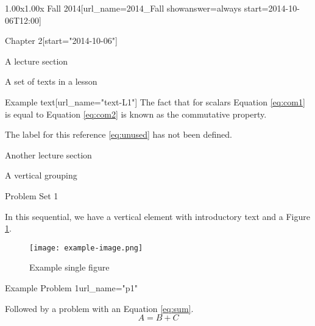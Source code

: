 \documentclass[12pt]{article}
\begin{document}
\begin{edXcourse}{1.00x}{1.00x Fall 2014}[url_name=2014_Fall showanswer=always start=2014-10-06T12:00]
\begin{edXchapter}{Chapter 2}[start="2014-10-06"]
\begin{edXsequential}{A lecture section}
\begin{edXvertical}{A set of texts in a lesson}
\begin{edXtext}{Example text}[url_name="text-L1"]
The fact that for scalars Equation \ref{eq:com1} is equal to Equation \ref{eq:com2} is known as the commutative property.

The label for this reference \ref{eq:unused} has not been defined.

\end{edXtext}

\end{edXvertical}

\end{edXsequential}

\begin{edXsequential}{Another lecture section}

\begin{edXvertical}{A vertical grouping}

\begin{edXtext}{Problem Set 1}

In this sequential, we have a vertical element with introductory text and a Figure \ref{fig:examplefig}.
\begin{figure}
  \begin{center}
    \texttt{[image: example-image.png]}
    \caption{Example single figure}
    \label{fig:examplefig}
  \end{center}
\end{figure}

\end{edXtext}

\begin{edXproblem}{Example Problem 1}{url_name="p1"}

Followed by a problem with an Equation \ref{eq:sum}.
\begin{equation}
  \boxed{A = B + C}
  \label{eq:sum}
\end{equation}

\end{edXproblem}

\end{edXvertical}

\end{edXsequential}

\end{edXchapter}

\end{edXcourse}
\end{document}
